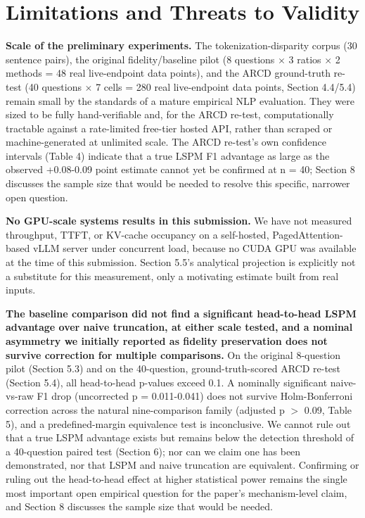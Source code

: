 \documentclass[pdflatex,sn-basic,Numbered]{sn-jnl}
\begin{document}
\section{Limitations and Threats to Validity}
\textbf{Scale of the preliminary experiments.} The tokenization-disparity corpus (30 sentence pairs), the original fidelity/baseline pilot (8 questions $\times$ 3 ratios $\times$ 2 methods = 48 real live-endpoint data points), and the ARCD ground-truth re-test (40 questions $\times$ 7 cells = 280 real live-endpoint data points, Section 4.4/5.4) remain small by the standards of a mature empirical NLP evaluation. They were sized to be fully hand-verifiable and, for the ARCD re-test, computationally tractable against a rate-limited free-tier hosted API, rather than scraped or machine-generated at unlimited scale. The ARCD re-test's own confidence intervals (Table 4) indicate that a true LSPM F1 advantage as large as the observed +0.08-0.09 point estimate cannot yet be confirmed at n = 40; Section 8 discusses the sample size that would be needed to resolve this specific, narrower open question.

\textbf{No GPU-scale systems results in this submission.} We have not measured throughput, TTFT, or KV-cache occupancy on a self-hosted, PagedAttention-based vLLM server under concurrent load, because no CUDA GPU was available at the time of this submission. Section 5.5's analytical projection is explicitly not a substitute for this measurement, only a motivating estimate built from real inputs.

\textbf{The baseline comparison did not find a significant head-to-head LSPM advantage over naive truncation, at either scale tested, and a nominal asymmetry we initially reported as fidelity preservation does not survive correction for multiple comparisons.} On the original 8-question pilot (Section 5.3) and on the 40-question, ground-truth-scored ARCD re-test (Section 5.4), all head-to-head p-values exceed 0.1. A nominally significant naive-vs-raw F1 drop (uncorrected p = 0.011-0.041) does not survive Holm-Bonferroni correction across the natural nine-comparison family (adjusted p $>$ 0.09, Table 5), and a predefined-margin equivalence test is inconclusive. We cannot rule out that a true LSPM advantage exists but remains below the detection threshold of a 40-question paired test (Section 6); nor can we claim one has been demonstrated, nor that LSPM and naive truncation are equivalent. Confirming or ruling out the head-to-head effect at higher statistical power remains the single most important open empirical question for the paper's mechanism-level claim, and Section 8 discusses the sample size that would be needed.
\end{document}
